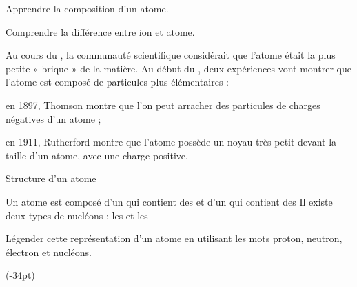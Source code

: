 \teteSndAtom



\begin{objectifs}
  \item Apprendre la composition d'un atome.
  \item Comprendre la différence entre ion et atome.
\end{objectifs}

\begin{contexte}
  Au cours du , la communauté scientifique considérait que l'atome était la plus petite « brique  » de la matière.
  Au début du , deux expériences vont montrer que l'atome est composé de particules plus élémentaires :
  \begin{listePoints}
    \item en 1897, Thomson montre que l'on peut arracher des particules de charges négatives d'un atome ;
    \item en 1911, Rutherford montre que l'atome possède un noyau très petit devant la taille d'un atome, avec une charge positive.
  \end{listePoints}
  
\end{contexte}



\begin{doc}{Structure d'un atome}
  \begin{importants}
    Un atome est composé d'un  qui contient des  et d'un  qui contient des     
    Il existe deux types de nucléons : les  et les 
  \end{importants}
\end{doc}

\numeroQuestion
Légender cette représentation d'un atome en utilisant les mots proton, neutron, électron et nucléons.

\begin{center}
\end{center}


(-34pt)

